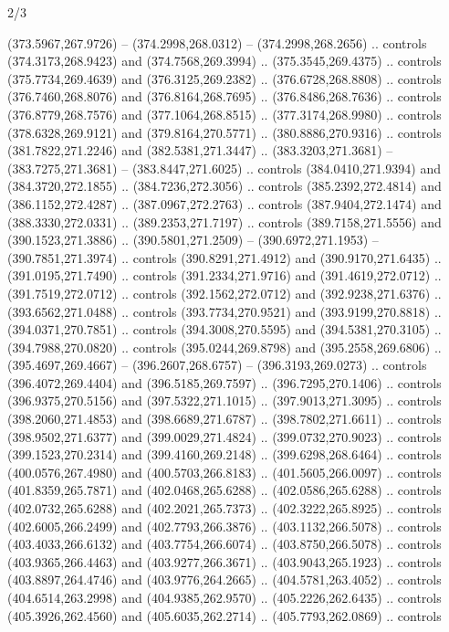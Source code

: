 \begin{flagdescription}{2/3}
\begin{scope}[xshift=0.5\flaglength,yshift=0.5\flagwidth,scale=\flagwidth/495.65]
\begin{scope}[y=0.8pt, x=0.8pt, yscale=-1,shift={(-463.76,-309.78)}]
  (373.5967,267.9726) -- (374.2998,268.0312) -- (374.2998,268.2656) .. controls
  (374.3173,268.9423) and (374.7568,269.3994) .. (375.3545,269.4375) .. controls
  (375.7734,269.4639) and (376.3125,269.2382) .. (376.6728,268.8808) .. controls
  (376.7460,268.8076) and (376.8164,268.7695) .. (376.8486,268.7636) .. controls
  (376.8779,268.7576) and (377.1064,268.8515) .. (377.3174,268.9980) .. controls
  (378.6328,269.9121) and (379.8164,270.5771) .. (380.8886,270.9316) .. controls
  (381.7822,271.2246) and (382.5381,271.3447) .. (383.3203,271.3681) --
  (383.7275,271.3681) -- (383.8447,271.6025) .. controls (384.0410,271.9394) and
  (384.3720,272.1855) .. (384.7236,272.3056) .. controls (385.2392,272.4814) and
  (386.1152,272.4287) .. (387.0967,272.2763) .. controls (387.9404,272.1474) and
  (388.3330,272.0331) .. (389.2353,271.7197) .. controls (389.7158,271.5556) and
  (390.1523,271.3886) .. (390.5801,271.2509) -- (390.6972,271.1953) --
  (390.7851,271.3974) .. controls (390.8291,271.4912) and (390.9170,271.6435) ..
  (391.0195,271.7490) .. controls (391.2334,271.9716) and (391.4619,272.0712) ..
  (391.7519,272.0712) .. controls (392.1562,272.0712) and (392.9238,271.6376) ..
  (393.6562,271.0488) .. controls (393.7734,270.9521) and (393.9199,270.8818) ..
  (394.0371,270.7851) .. controls (394.3008,270.5595) and (394.5381,270.3105) ..
  (394.7988,270.0820) .. controls (395.0244,269.8798) and (395.2558,269.6806) ..
  (395.4697,269.4667) -- (396.2607,268.6757) -- (396.3193,269.0273) .. controls
  (396.4072,269.4404) and (396.5185,269.7597) .. (396.7295,270.1406) .. controls
  (396.9375,270.5156) and (397.5322,271.1015) .. (397.9013,271.3095) .. controls
  (398.2060,271.4853) and (398.6689,271.6787) .. (398.7802,271.6611) .. controls
  (398.9502,271.6377) and (399.0029,271.4824) .. (399.0732,270.9023) .. controls
  (399.1523,270.2314) and (399.4160,269.2148) .. (399.6298,268.6464) .. controls
  (400.0576,267.4980) and (400.5703,266.8183) .. (401.5605,266.0097) .. controls
  (401.8359,265.7871) and (402.0468,265.6288) .. (402.0586,265.6288) .. controls
  (402.0732,265.6288) and (402.2021,265.7373) .. (402.3222,265.8925) .. controls
  (402.6005,266.2499) and (402.7793,266.3876) .. (403.1132,266.5078) .. controls
  (403.4033,266.6132) and (403.7754,266.6074) .. (403.8750,266.5078) .. controls
  (403.9365,266.4463) and (403.9277,266.3671) .. (403.9043,265.1923) .. controls
  (403.8897,264.4746) and (403.9776,264.2665) .. (404.5781,263.4052) .. controls
  (404.6514,263.2998) and (404.9385,262.9570) .. (405.2226,262.6435) .. controls
  (405.3926,262.4560) and (405.6035,262.2714) .. (405.7793,262.0869) .. controls

\end{scope}
\end{scope}
\end{flagdescription}
